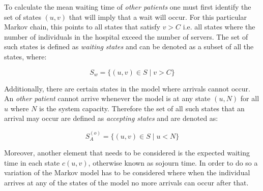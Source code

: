 To calculate the mean waiting time of \textit{other patients} one must first identify 
the set of states \((u, v)\) that will imply that a wait will occur. 
For this particular Markov chain, this points to all states that satisfy \(v > C\) 
i.e. all states where the number of individuals in the hospital exceed the number 
of servers. 
The set of such states is defined as \textit{waiting states} and can be denoted 
as a subset of all the states, where:

\begin{equation} \label{eq:waiting_states}
    S_w = \{(u, v) \in S \; | \; v > C \}    
\end{equation}

Additionally, there are certain states in the model where arrivals cannot occur. 
An \textit{other patient} cannot arrive whenever the model is at any state \((u, N)\) 
for all \(u\) where \(N\) is the system capacity. 
Therefore the set of all such states that an arrival may occur are defined as 
\textit{accepting states} and are denoted as:

\begin{equation}\label{accepting_states_others}
    S_A^{(o)} = \{(u, v) \in S \; | \; u < N \}
\end{equation}



Moreover, another element that needs to be considered is the expected waiting time 
in each state \( c(u,v) \), otherwise known as sojourn time. 
In order to do so a variation of the Markov model has to be considered where when 
the individual arrives at any of the states of the model no more arrivals can 
occur after that. 


